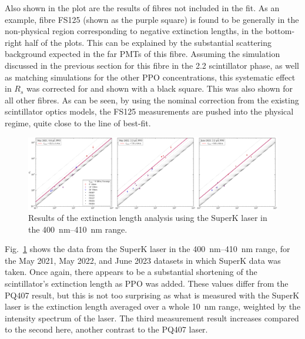 Also shown in the plot are the results of fibres not included in the fit. As an example, fibre FS125 (shown as the purple square) is found to be generally in the non-physical region corresponding to negative extinction lengths, in the bottom-right half of the plots. This can be explained by the substantial scattering background expected in the far PMTs of this fibre. Assuming the simulation discussed in the previous section for this fibre in the \SI{2.2}{\gpl} scintillator phase, as well as matching simulations for the other PPO concentrations, this systematic effect in $R_{s}$ was corrected for and shown with a black square. This was also shown for all other fibres. As can be seen, by using the nominal correction from the existing scintillator optics models, the FS125 measurements are pushed into the physical regime, quite close to the line of best-fit.

\begin{figure}
    \centering
    \includegraphics[width=\textwidth]{5_SMELLIEAnalysis/images/rsrw_plot_combined_superK[400,410].pdf}
    \caption[Results of the extinction length analysis using the SuperK laser in the \SIrange{400}{410}{\nm} range]
    {Results of the extinction length analysis using the SuperK laser in the \SIrange{400}{410}{\nm} range.}
    \label{fig:smellie_ext_length_results_SK_400410}
\end{figure}

Fig.~\ref{fig:smellie_ext_length_results_SK_400410} shows the data from the SuperK laser in the \SIrange{400}{410}{\nm} range, for the May 2021, May 2022, and June 2023 datasets in which SuperK data was taken. Once again, there appears to be a substantial shortening of the scintillator's extinction length as PPO was added. These values differ from the PQ407 result, but this is not too surprising as what is measured with the SuperK laser is the extinction length averaged over a whole \SI{10}{\nm} range, weighted by the intensity spectrum of the laser. The third measurement result increases compared to the second here, another contrast to the PQ407 laser.

